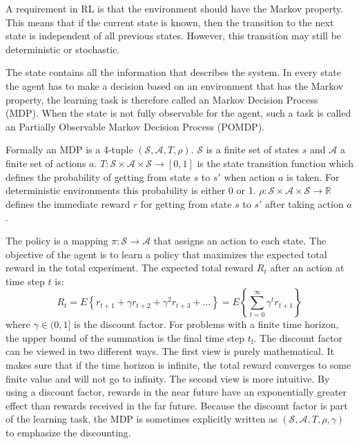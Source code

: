 \documentclass[a4paper,11pt]{mscLiterature}
\begin{document}
A requirement in RL is that the environment should have the Markov property. This means that if the current state is known, then the transition to the next state is independent of all previous states. However, this transition may still be deterministic or stochastic.

The state contains all the information that describes the system. In every state the agent has to make a decision based on an environment that has the Markov property, the learning task is therefore called an Markov Decision Process (MDP). When the state is not fully observable for the agent, such a task is called an Partially Observable Markov Decision Process (POMDP). 

Formally an MDP is a 4-tuple $(\mathcal{S},\mathcal{A},T,\rho)$. $\mathcal{S}$ is a finite set of states $s$ and $\mathcal{A}$ a finite set of actions $a$. $T:\mathcal{S}\times \mathcal{A}\times \mathcal{S} \rightarrow [0,1]$ is the state transition function which defines the probability of getting from state $s$ to $s'$ when action $a$ is taken. For deterministic environments this probability is either 0 or 1. $\rho:\mathcal{S}\times \mathcal{A}\times \mathcal{S} \rightarrow  \mathbb{R}$ defines the immediate reward $r$ for getting from state $s$ to $s'$ after taking action $a$. 

The policy is a mapping $\pi : \mathcal{S} \rightarrow \mathcal{A}$ that assigns an action to each state. The objective of the agent is to learn a policy that maximizes the expected total reward in the total experiment. The expected total reward $R_t$ after an action at time step $t$ is:
\begin{equation}\label{eqn:totalReward} 
	R_t = E\left\{ r_{t+1} + \gamma r_{t+2} + \gamma^2 r_{t+3} + ...\right\} = E\left\{ \sum_{t=0}^\infty\gamma^t r_{t+1} \right\}  \end{equation}
where $\gamma\in (0,1]$ is the discount factor. For problems with a finite time horizon, the upper bound of the summation is the final time step $t_\mathrm{f}$. The discount factor can be viewed in two different ways. The first view is purely mathematical. It makes sure that if the time horizon is infinite, the total reward converges to some finite value and will not go to infinity. The second view is more intuitive. By using a discount factor, rewards in the near future have an exponentially greater effect than rewards received in the far future. Because the discount factor is part of the learning task, the MDP is sometimes explicitly written as $(\mathcal{S},\mathcal{A},T,\rho,\gamma)$ to emphasize the discounting. 
\end{document}
